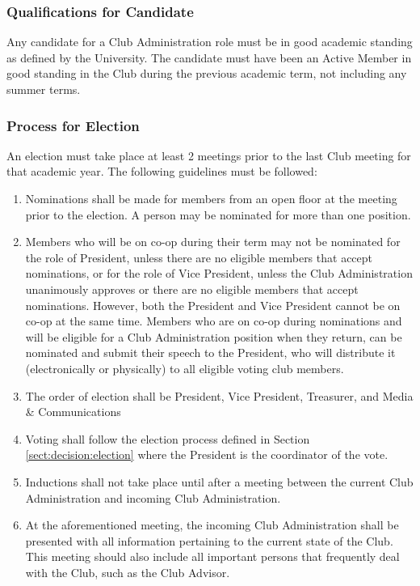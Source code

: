 \documentclass[english,11pt]{article}
\begin{document}
\subsubsection{Qualifications for Candidate} \label{subsect:cadmin:selection:qualifications}
Any candidate for a Club Administration role must be in good academic standing as defined by the University.
The candidate must have been an Active Member in good standing in the Club during the previous academic term, not including any summer terms.

\subsubsection{Process for Election} \label{subsect:cadmin:selection:election}
An election must take place at least 2 meetings prior to the last Club meeting for that academic year. The following guidelines must be followed:

\begin{enumerate}[label=\alph*.]
    \item Nominations shall be made for members from an open floor at the meeting prior to the election.
          A person may be nominated for more than one position.
    \item Members who will be on co-op during their term may not be nominated for the role of President, unless there are no eligible members that accept nominations, or for the role of Vice President, unless the Club Administration unanimously approves or there are no eligible members that accept nominations.
          However, both the President and Vice President cannot be on co-op at the same time.
          Members who are on co-op during nominations and will be eligible for a Club Administration position when they return, can be nominated and submit their speech to the President, who will distribute it (electronically or physically) to all eligible voting club members.
    \item The order of election shall be President, Vice President, Treasurer, and Media \& Communications
    \item Voting shall follow the election process defined in Section \ref{sect:decision:election} where the President is the coordinator of the vote.
    \item Inductions shall not take place until after a meeting between the current Club Administration and incoming Club Administration.
    \item At the aforementioned meeting, the incoming Club Administration shall be presented with all information pertaining to the current state of the Club.
        This meeting should also include all important persons that frequently deal with the Club, such as the Club Advisor.
\end{enumerate}
\end{document}
